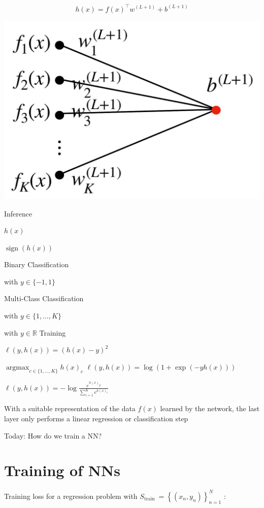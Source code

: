 \documentclass[10pt]{article}
\begin{document}
$$
h(x)=f(x)^{\top} w^{(L+1)}+b^{(L+1)}
$$

\begin{center}
\includegraphics[max width=\textwidth]{2023_12_30_360102aa01a03e5a4270g-05}
\end{center}

Inference

$h(x)$

$\operatorname{sign}(h(x))$

Binary Classification

with $y \in\{-1,1\}$

Multi-Class Classification

with $y \in\{1, \ldots, K\}$

with $y \in \mathbb{R}$
Training

$\ell(y, h(x))=(h(x)-y)^{2}$

$\operatorname{argmax}_{c \in\{1, \ldots, K\}} h(x)_{c}$ $\ell(y, h(x))=\log (1+\exp (-y h(x)))$

$\ell(y, h(x))=-\log \frac{e^{h(x)_{y}}}{\sum_{i=1}^{K} e^{h(x)_{i}}}$

With a suitable representation of the data $f(x)$ learned by the network, the last layer only performs a linear regression or classification step

Today: How do we train a NN?

\section*{Training of NNs}
Training loss for a regression problem with $S_{\text {train }}=\left\{\left(x_{n}, y_{n}\right)\right\}_{n=1}^{N}$ :
\end{document}
